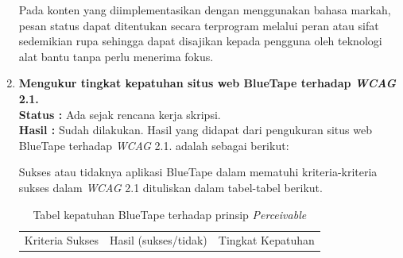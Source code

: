\documentclass[a4paper,twoside]{article}
\begin{document}
\begin{enumerate}
		Pada konten yang diimplementasikan dengan menggunakan bahasa markah, pesan status dapat ditentukan secara terprogram melalui peran atau sifat sedemikian rupa sehingga dapat disajikan kepada pengguna oleh teknologi alat bantu tanpa perlu menerima fokus.


		
		\item \textbf{Mengukur tingkat kepatuhan situs web BlueTape terhadap \textit{WCAG} 2.1.}\\
		{\bf Status :} Ada sejak rencana kerja skripsi.\\
		{\bf Hasil :} Sudah dilakukan. Hasil yang didapat dari pengukuran situs web BlueTape terhadap \textit{WCAG} 2.1. adalah sebagai berikut:

		Sukses atau tidaknya aplikasi BlueTape dalam mematuhi kriteria-kriteria sukses dalam \textit{WCAG} 2.1 dituliskan dalam tabel-tabel berikut.
		\label{sec:kepatuhan_bluetape_terhadap_wcag_2.1}
		\begin{table}[H]
			\centering 
			\caption{Tabel kepatuhan BlueTape terhadap prinsip \textit{Perceivable}}
			\label{tab:kepatuhan_bluetape_perceivable}
			\begin{tabular}{|c|c|c|}
				\toprule
				Kriteria Sukses & Hasil (sukses/tidak) & Tingkat Kepatuhan \\


\end{tabular}
\end{table}
\end{enumerate}
\end{document}
